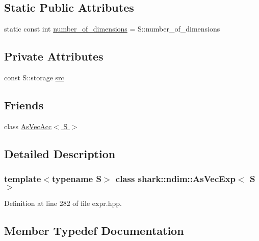 \subsection*{Static Public Attributes}
\begin{DoxyCompactItemize}
\item 
static const int \hyperlink{classshark_1_1ndim_1_1_as_vec_exp_3_01_s_01_4_ab20bf5b87d7ea7464eb4cdacd185e1a2}{number\+\_\+of\+\_\+dimensions} = S\+::number\+\_\+of\+\_\+dimensions
\end{DoxyCompactItemize}
\subsection*{Private Attributes}
\begin{DoxyCompactItemize}
\item 
const S\+::storage \hyperlink{classshark_1_1ndim_1_1_as_vec_exp_3_01_s_01_4_aa80febebc38b07290aac9a41c7762252}{src}
\end{DoxyCompactItemize}
\subsection*{Friends}
\begin{DoxyCompactItemize}
\item 
class \hyperlink{classshark_1_1ndim_1_1_as_vec_exp_3_01_s_01_4_ac0cbf4be86ef144f231f64fc297e025f}{As\+Vec\+Acc$<$ S $>$}
\end{DoxyCompactItemize}


\subsection{Detailed Description}
\subsubsection*{template$<$typename S$>$\newline
class shark\+::ndim\+::\+As\+Vec\+Exp$<$ S $>$}



Definition at line 282 of file expr.\+hpp.



\subsection{Member Typedef Documentation}
\hypertarget{classshark_1_1ndim_1_1_as_vec_exp_3_01_s_01_4_a94453f3532458ea9d9ff0137be5bf4b5}{}\label{classshark_1_1ndim_1_1_as_vec_exp_3_01_s_01_4_a94453f3532458ea9d9ff0137be5bf4b5} 
